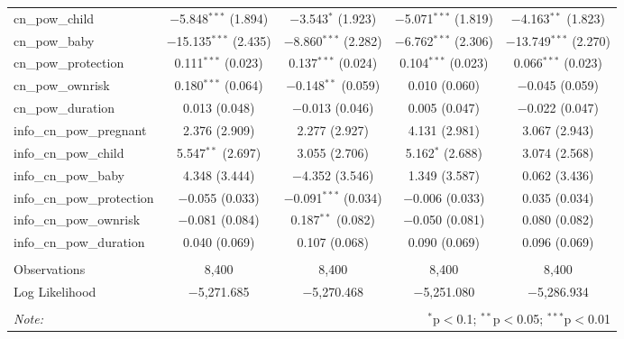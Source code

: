 \begin{table}[!htbp]
\begin{tabular}{@{\extracolsep{1pt}}lcccc}
  cn\_pow\_child & $-$5.848$^{***}$ (1.894) & $-$3.543$^{*}$ (1.923) & $-$5.071$^{***}$ (1.819) & $-$4.163$^{**}$ (1.823) \\ 
  cn\_pow\_baby & $-$15.135$^{***}$ (2.435) & $-$8.860$^{***}$ (2.282) & $-$6.762$^{***}$ (2.306) & $-$13.749$^{***}$ (2.270) \\ 
  cn\_pow\_protection & 0.111$^{***}$ (0.023) & 0.137$^{***}$ (0.024) & 0.104$^{***}$ (0.023) & 0.066$^{***}$ (0.023) \\ 
  cn\_pow\_ownrisk & 0.180$^{***}$ (0.064) & $-$0.148$^{**}$ (0.059) & 0.010 (0.060) & $-$0.045 (0.059) \\ 
  cn\_pow\_duration & 0.013 (0.048) & $-$0.013 (0.046) & 0.005 (0.047) & $-$0.022 (0.047) \\ 
  info\_cn\_pow\_pregnant & 2.376 (2.909) & 2.277 (2.927) & 4.131 (2.981) & 3.067 (2.943) \\ 
  info\_cn\_pow\_child & 5.547$^{**}$ (2.697) & 3.055 (2.706) & 5.162$^{*}$ (2.688) & 3.074 (2.568) \\ 
  info\_cn\_pow\_baby & 4.348 (3.444) & $-$4.352 (3.546) & 1.349 (3.587) & 0.062 (3.436) \\ 
  info\_cn\_pow\_protection & $-$0.055 (0.033) & $-$0.091$^{***}$ (0.034) & $-$0.006 (0.033) & 0.035 (0.034) \\ 
  info\_cn\_pow\_ownrisk & $-$0.081 (0.084) & 0.187$^{**}$ (0.082) & $-$0.050 (0.081) & 0.080 (0.082) \\ 
  info\_cn\_pow\_duration & 0.040 (0.069) & 0.107 (0.068) & 0.090 (0.069) & 0.096 (0.069) \\ 
 \hline \\[-1.8ex] 
Observations & 8,400 & 8,400 & 8,400 & 8,400 \\ 
Log Likelihood & $-$5,271.685 & $-$5,270.468 & $-$5,251.080 & $-$5,286.934 \\ 
\hline 
\hline \\[-1.8ex] 
\textit{Note:}  & \multicolumn{4}{r}{$^{*}$p$<$0.1; $^{**}$p$<$0.05; $^{***}$p$<$0.01} \\ 
\end{tabular} 
\end{table} 
